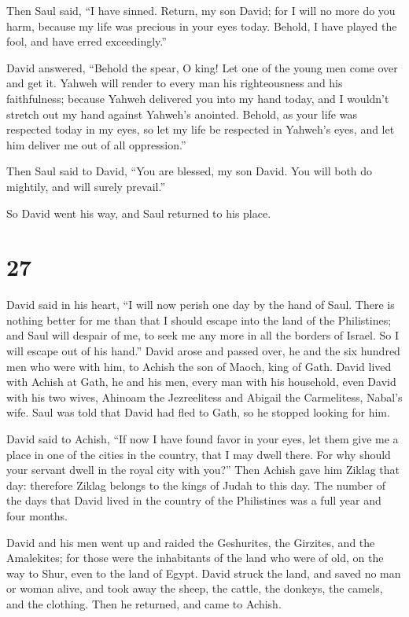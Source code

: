  Then Saul said, ``I have sinned. Return, my son David;
for I will no more do you harm, because my life was precious in your
eyes today. Behold, I have played the fool, and have erred
exceedingly.''

 David answered, ``Behold the spear, O king! Let one of
the young men come over and get it.  Yahweh will render
to every man his righteousness and his faithfulness; because Yahweh
delivered you into my hand today, and I wouldn't stretch out my hand
against Yahweh's anointed.  Behold, as your life was
respected today in my eyes, so let my life be respected in Yahweh's
eyes, and let him deliver me out of all oppression.''

 Then Saul said to David, ``You are blessed, my son
David. You will both do mightily, and will surely prevail.''

So David went his way, and Saul returned to his place.

\hypertarget{section-26}{%
\section{27}\label{section-26}}

 David said in his heart, ``I will now perish one day by
the hand of Saul. There is nothing better for me than that I should
escape into the land of the Philistines; and Saul will despair of me, to
seek me any more in all the borders of Israel. So I will escape out of
his hand.''  David arose and passed over, he and the six
hundred men who were with him, to Achish the son of Maoch, king of Gath.
 David lived with Achish at Gath, he and his men, every
man with his household, even David with his two wives, Ahinoam the
Jezreelitess and Abigail the Carmelitess, Nabal's wife. 
Saul was told that David had fled to Gath, so he stopped looking for
him.

 David said to Achish, ``If now I have found favor in your
eyes, let them give me a place in one of the cities in the country, that
I may dwell there. For why should your servant dwell in the royal city
with you?''  Then Achish gave him Ziklag that day:
therefore Ziklag belongs to the kings of Judah to this day.
 The number of the days that David lived in the country of
the Philistines was a full year and four months.

 David and his men went up and raided the Geshurites, the
Girzites, and the Amalekites; for those were the inhabitants of the land
who were of old, on the way to Shur, even to the land of Egypt.
 David struck the land, and saved no man or woman alive,
and took away the sheep, the cattle, the donkeys, the camels, and the
clothing. Then he returned, and came to Achish.

